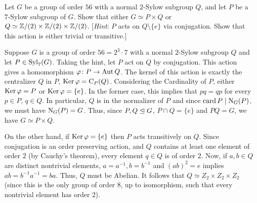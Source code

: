 \begin{problem}
  Let \(G\) be a group of order \(56\) with a normal \(2\)-Sylow subgroup
  \(Q\), and let \(P\) be a \(7\)-Sylow subgroup of \(G\). Show that either
  \(G\simeq P\times Q\) or \(Q\simeq\mathbb{Z}/(2)\times\mathbb{Z}/(2)\times\mathbb{Z}/(2)\).
  [\emph{Hint}: \(P\) acts on \(Q\setminus\{e\}\) via conjugation. Show
  that this action is either trivial or transitive.]
\end{problem}
\begin{solution}
  Suppose \(G\) is a group of order \(56=2^3\cdot 7\) with a normal
  \(2\)-Sylow subgroup \(Q\) and let \(P\in\operatorname{Syl}_7(G)\). Taking the hint,
  let \(P\) act on \(Q\) by conjugation. This action gives a homomorphism
  \(\varphi\colon P\to \operatorname{Aut} Q\). The kernel of this action is exactly the
  centralizer \(Q\) in \(P\), \(\operatorname{Ker}\varphi=\mathrm{C}_P(Q)\). Considering the
  Cardinality of \(P\), either \(\operatorname{Ker}\varphi=P\) or
  \(\operatorname{Ker}\varphi=\{e\}\). In the former case, this implies that \(pq=qp\)
  for every \(p\in P\), \(q\in Q\). In particular, \(Q\) is in the
  normalizer of \(P\) and since \(\operatorname{card} P\mid\mathrm{N}_G(P)\), we must have
  \(\mathrm{N}_G(P)=G\). Thus, since \(P,Q\trianglelefteq G\), \(P\cap Q=\{e\}\) and
  \(PQ=G\), we have \(G\simeq P\times Q\).

  On the other hand, if \(\operatorname{Ker}\varphi=\{e\}\) then \(P\) acts transitively
  on \(Q\). Since conjugation is an order preserving action, and \(Q\)
  contains at least one element of order \(2\) (by Cauchy's theorem), every
  element \(q\in Q\) is of order \(2\). Now, if \(a,b\in Q\) are distinct
  nontrivial elements, \(a=a^{-1},b=b^{-1}\) and \((ab)^2=e\) implies
  \(ab=b^{-1}a^{-1}=ba\). Thus, \(Q\) must be Abelian. It follows that
  \(Q\simeq Z_2\times Z_2\times Z_2\) (since this is the only group of
  order \(8\), up to isomorphism, such that every nontrivial element has
  order \(2\)).
\end{solution}

